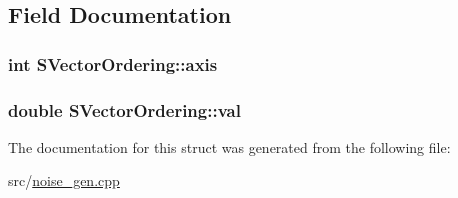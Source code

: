 \subsection{Field Documentation}
\hypertarget{structSVectorOrdering_a4e626e681f4dcdbdec76bd5890f89ec2}{
\subsubsection[{axis}]{\setlength{\rightskip}{0pt plus 5cm}int {\bf SVectorOrdering::axis}}}
\label{structSVectorOrdering_a4e626e681f4dcdbdec76bd5890f89ec2}
\hypertarget{structSVectorOrdering_ac3340f979d692941003ee73bc3c76a71}{
\subsubsection[{val}]{\setlength{\rightskip}{0pt plus 5cm}double {\bf SVectorOrdering::val}}}
\label{structSVectorOrdering_ac3340f979d692941003ee73bc3c76a71}


The documentation for this struct was generated from the following file:\begin{DoxyCompactItemize}
\item 
src/\hyperlink{noise__gen_8cpp}{noise\_\-gen.cpp}\end{DoxyCompactItemize}
